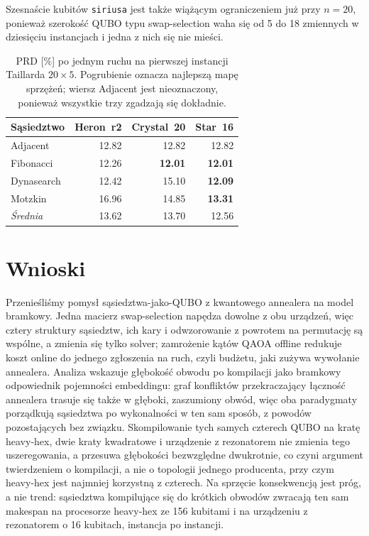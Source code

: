 \documentclass[11pt,a4paper]{article}
\begin{document}
Szesnaście kubitów \texttt{siriusa} jest także wiążącym ograniczeniem już przy
$n=20$, ponieważ szerokość QUBO typu swap-selection waha się od 5 do 18
zmiennych w dziesięciu instancjach i jedna z nich się nie mieści.

\begin{table}[t]
\centering
\caption{PRD [\%] po jednym ruchu na pierwszej instancji Taillarda
  $20\times5$. Pogrubienie oznacza najlepszą mapę sprzężeń; wiersz Adjacent
  jest nieoznaczony, ponieważ wszystkie trzy zgadzają się dokładnie.}
\label{tab:arch}
\footnotesize
\begin{tabular*}{\textwidth}{@{\extracolsep{\fill}}lrrr@{}}
\toprule
Sąsiedztwo & Heron~r2 & Crystal~20 & Star~16 \\
\midrule
Adjacent    & 12.82 & 12.82 & 12.82 \\
Fibonacci   & 12.26 & \textbf{12.01} & \textbf{12.01} \\
Dynasearch  & 12.42 & 15.10 & \textbf{12.09} \\
Motzkin     & 16.96 & 14.85 & \textbf{13.31} \\
\midrule
\emph{Średnia} & 13.62 & 13.70 & 12.56 \\
\bottomrule
\end{tabular*}
\end{table}

\section{Wnioski}
\label{sec:conclusions}
Przenieśliśmy pomysł sąsiedztwa-jako-QUBO z kwantowego annealera na model
bramkowy. Jedna macierz swap-selection napędza dowolne z obu urządzeń, więc
cztery struktury sąsiedztw, ich kary i odwzorowanie z powrotem na permutację
są wspólne, a zmienia się tylko solver; zamrożenie kątów QAOA offline redukuje
koszt online do jednego zgłoszenia na ruch, czyli budżetu, jaki zużywa
wywołanie annealera. Analiza wskazuje głębokość obwodu po kompilacji jako
bramkowy odpowiednik pojemności embeddingu: graf konfliktów przekraczający
łączność annealera trasuje się także w głęboki, zaszumiony obwód, więc oba
paradygmaty porządkują sąsiedztwa po wykonalności w ten sam sposób, z powodów
pozostających bez związku. Skompilowanie tych samych czterech QUBO na kratę
heavy-hex, dwie kraty kwadratowe i urządzenie z rezonatorem nie zmienia tego
uszeregowania, a przesuwa głębokości bezwzględne dwukrotnie, co czyni argument
twierdzeniem o kompilacji, a nie o topologii jednego producenta, przy czym
heavy-hex jest najmniej korzystną z czterech. Na sprzęcie konsekwencją jest
próg, a nie trend: sąsiedztwa kompilujące się do krótkich obwodów zwracają ten
sam makespan na procesorze heavy-hex ze 156 kubitami i na urządzeniu
z rezonatorem o 16 kubitach, instancja po instancji.
\end{document}
